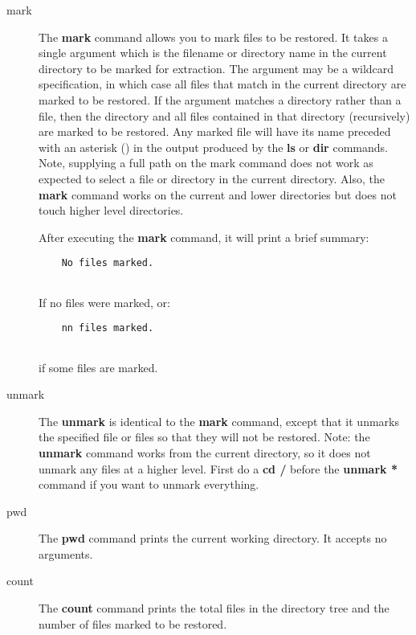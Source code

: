 \begin{description}
\item [mark]
   The {\bf mark} command allows you to mark files  to be restored. It takes a
single argument which is the filename  or directory name in the current
directory to be marked for extraction.  The argument may be a wildcard
specification, in which  case all files that match in the current directory
are marked to be  restored. If the argument matches a directory rather than a
file,  then the directory and all files contained in that directory
(recursively)  are marked to be restored. Any marked file will have its name 
preceded with an asterisk ({\bf *}) in the output produced by the  {\bf ls} or
{\bf dir} commands. Note, supplying a full path on  the mark command does not
work as expected to select a file or  directory in the current directory.
Also, the {\bf mark} command works  on the current and lower directories but
does not touch higher level  directories.  

After executing the {\bf mark} command, it will print a brief summary:  

\footnotesize
\begin{verbatim}
    No files marked.
    
\end{verbatim}
\normalsize

If no files were marked, or:  

\footnotesize
\begin{verbatim}
    nn files marked.
    
\end{verbatim}
\normalsize

if some files are marked.  

\item [unmark]
   The {\bf unmark} is identical to the {\bf mark}  command, except that it
unmarks the specified file or files so that  they will not be restored. Note:
the {\bf unmark} command works from  the current directory, so it does not
unmark any files at a higher  level. First do a {\bf cd /} before the {\bf
unmark *} command if  you want to unmark everything.  

\item [pwd]
   The {\bf pwd} command prints the current working  directory. It accepts no
arguments.  

\item [count]
   The {\bf count} command prints the total files in the  directory tree and the
number of files marked to be restored.  


\end{description}
